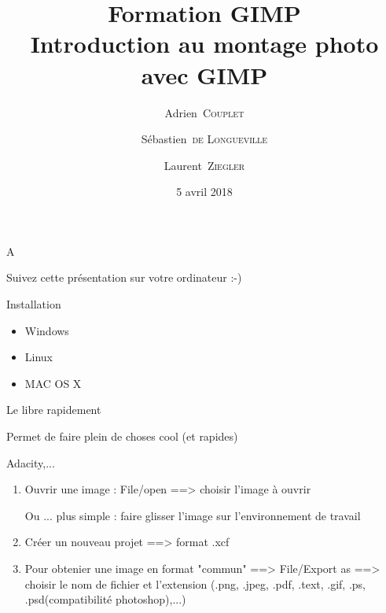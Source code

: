 \documentclass[10pt,svgnames,usenames,table]{beamer}
\institute{Louvain-li-Nux}
\title{\textbf{Formation GIMP}\\
Introduction au montage photo avec GIMP}
\author{Adrien~\textsc{Couplet} \and Sébastien~\textsc{de Longueville} \and Laurent~\textsc{Ziegler}}
\date{5 avril 2018}
\begin{document}
\begin{frame}
	\maketitle
\end{frame}

\begin{frame}
	A
	
\end{frame}

\begin{frame}
  \begin{center}\Large
  Suivez cette présentation sur votre ordinateur :-)
  
  \vspace{1cm}
  \end{center}
\end{frame}

\begin{frame}
	Installation
	
	\begin{itemize}
	\item Windows
	
	
	\item Linux
	
	
	\item MAC OS X
	
		
	\end{itemize}
\end{frame}

\begin{frame}
	Le libre rapidement 
	
	Permet de faire plein de choses cool (et rapides)
	
	Adacity,...
\end{frame}

\begin{frame}
	
	\begin{enumerate}
	\item Ouvrir une image : File/open ==> choisir l'image à ouvrir 
	
	Ou ... plus simple : faire glisser l'image sur l'environnement de travail
	
	\item Créer un nouveau projet ==> format .xcf
	
	\item Pour obtenier une image en format "commun" ==> File/Export as ==> choisir le nom de fichier et l'extension (.png, .jpeg, .pdf, .text, .gif, .ps, .psd(compatibilité photoshop),...)
	\end{enumerate}
\end{frame}
\end{document}
